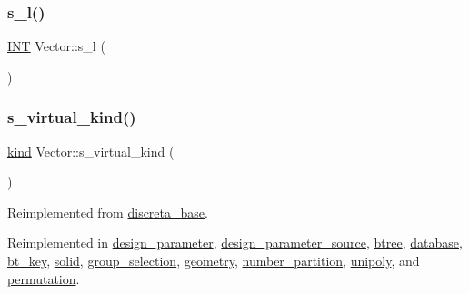 \mbox{\label{class_vector_ad2dc082288f858d22a528832289e0704}} 
\subsubsection{\texorpdfstring{s\+\_\+l()}{s\_l()}}
{\footnotesize\ttfamily \mbox{\hyperlink{galois_8h_a09fddde158a3a20bd2dcadb609de11dc}{I\+NT}} Vector\+::s\+\_\+l (\begin{DoxyParamCaption}{ }\end{DoxyParamCaption})}

\mbox{\label{class_vector_a20550e70d02cbe484032c7f6b0833a0f}} 
\subsubsection{\texorpdfstring{s\+\_\+virtual\+\_\+kind()}{s\_virtual\_kind()}}
{\footnotesize\ttfamily \mbox{\hyperlink{discreta_8h_aaf25ee7e2306d78c74ec7bc48f092e81}{kind}} Vector\+::s\+\_\+virtual\+\_\+kind (\begin{DoxyParamCaption}{ }\end{DoxyParamCaption})\hspace{0.3cm}{\ttfamily [virtual]}}



Reimplemented from \mbox{\hyperlink{classdiscreta__base_a52778a6d6943a468be083d0785d418fb}{discreta\+\_\+base}}.



Reimplemented in \mbox{\hyperlink{classdesign__parameter_af41eca1f66a8113dd0b892b26d791028}{design\+\_\+parameter}}, \mbox{\hyperlink{classdesign__parameter__source_ad3ee1c1d1dfa39a6eb3e2ee538b0e350}{design\+\_\+parameter\+\_\+source}}, \mbox{\hyperlink{classbtree_afffc3582b6eda450238f4cb268e79ef3}{btree}}, \mbox{\hyperlink{classdatabase_a30a79d9d1ae22f160368de28625ddeba}{database}}, \mbox{\hyperlink{classbt__key_a53b7441523674e20f5c8f5c81eaccad4}{bt\+\_\+key}}, \mbox{\hyperlink{classsolid_aae18938e9f7d9784734fe72e8d3223a7}{solid}}, \mbox{\hyperlink{classgroup__selection_a21d7be997a2787d8a1284696b01038e8}{group\+\_\+selection}}, \mbox{\hyperlink{classgeometry_a289c387cc78ff0f0379646cded7648f4}{geometry}}, \mbox{\hyperlink{classnumber__partition_aaa88b590321ba25867fb1c70451c629a}{number\+\_\+partition}}, \mbox{\hyperlink{classunipoly_a62303d2461523c791edc16fe40371e18}{unipoly}}, and \mbox{\hyperlink{classpermutation_a2840be30bd1e636da5a955973c0c70b8}{permutation}}.

